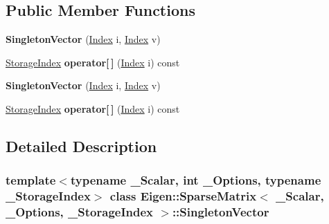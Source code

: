 \subsection*{Public Member Functions}
\begin{DoxyCompactItemize}
\item 
\mbox{\label{class_eigen_1_1_sparse_matrix_1_1_singleton_vector_a99863c3583a12e4d1e7ed06908650218}} 
{\bfseries Singleton\+Vector} (\hyperlink{group___core___module_a554f30542cc2316add4b1ea0a492ff02}{Index} i, \hyperlink{group___core___module_a554f30542cc2316add4b1ea0a492ff02}{Index} v)
\item 
\mbox{\label{class_eigen_1_1_sparse_matrix_1_1_singleton_vector_abe6509308a32c7b9a5cbc8729ad5e1da}} 
\hyperlink{group___sparse_core___module_a0b540ba724726ebe953f8c0df06081ed}{Storage\+Index} {\bfseries operator\mbox{[}$\,$\mbox{]}} (\hyperlink{group___core___module_a554f30542cc2316add4b1ea0a492ff02}{Index} i) const
\item 
\mbox{\label{class_eigen_1_1_sparse_matrix_1_1_singleton_vector_a99863c3583a12e4d1e7ed06908650218}} 
{\bfseries Singleton\+Vector} (\hyperlink{group___core___module_a554f30542cc2316add4b1ea0a492ff02}{Index} i, \hyperlink{group___core___module_a554f30542cc2316add4b1ea0a492ff02}{Index} v)
\item 
\mbox{\label{class_eigen_1_1_sparse_matrix_1_1_singleton_vector_abe6509308a32c7b9a5cbc8729ad5e1da}} 
\hyperlink{group___sparse_core___module_a0b540ba724726ebe953f8c0df06081ed}{Storage\+Index} {\bfseries operator\mbox{[}$\,$\mbox{]}} (\hyperlink{group___core___module_a554f30542cc2316add4b1ea0a492ff02}{Index} i) const
\end{DoxyCompactItemize}


\subsection{Detailed Description}
\subsubsection*{template$<$typename \+\_\+\+Scalar, int \+\_\+\+Options, typename \+\_\+\+Storage\+Index$>$\newline
class Eigen\+::\+Sparse\+Matrix$<$ \+\_\+\+Scalar, \+\_\+\+Options, \+\_\+\+Storage\+Index $>$\+::\+Singleton\+Vector}



